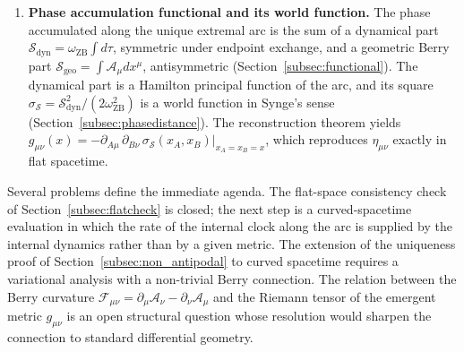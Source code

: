 \documentclass[%
 reprint, amsmath,amssymb, aps, prb, ]{revtex4-2}
\numberwithin{equation}{section}
\newcommand{\omZB}{\omega_{\text{ZB}}}
\begin{document}
\begin{enumerate}
\item \textbf{Phase accumulation functional and its world function.} The phase accumulated along the unique extremal arc is the sum of a dynamical part $\mathcal{S}_{\mathrm{dyn}} = \omZB\int d\tau$, symmetric under endpoint exchange, and a geometric Berry part $\mathcal{S}_{\mathrm{geo}} = \int\mathcal{A}_\mu dx^\mu$, antisymmetric (Section~\ref{subsec:functional}). The dynamical part is a Hamilton principal function of the arc, and its square $\sigma_{\mathcal{S}} = \mathcal{S}_{\mathrm{dyn}}^2/(2\omZB^2)$ is a world function in Synge's sense (Section~\ref{subsec:phasedistance}). The reconstruction theorem yields $g_{\mu\nu}(x) = -\partial_{A\mu}\,\partial_{B\nu}\,\sigma_{\mathcal{S}}(x_A,x_B)\big|_{x_A=x_B=x}$, which reproduces $\eta_{\mu\nu}$ exactly in flat spacetime.

\end{enumerate}

Several problems define the immediate agenda. The flat-space consistency check of Section~\ref{subsec:flatcheck} is closed; the next step is a curved-spacetime evaluation in which the rate of the internal clock along the arc is supplied by the internal dynamics rather than by a given metric. The extension of the uniqueness proof of Section~\ref{subsec:non_antipodal} to curved spacetime requires a variational analysis with a non-trivial Berry connection. The relation between the Berry curvature $\mathcal{F}_{\mu\nu}=\partial_\mu\mathcal{A}_\nu-\partial_\nu\mathcal{A}_\mu$ and the Riemann tensor of the emergent metric $g_{\mu\nu}$ is an open structural question whose resolution would sharpen the connection to standard differential geometry.
\end{document}
